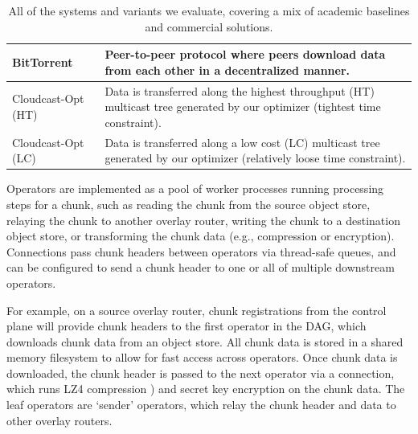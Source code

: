 \begin{table}[t!]
\begin{tabularx}{\textwidth}{ l X }
    BitTorrent~\cite{twitter-bittorrent} & Peer-to-peer protocol where peers download data from each other in a decentralized manner.\\
    \midrule
    Cloudcast-Opt (HT) & Data is transferred along the highest throughput (HT) multicast tree generated by our optimizer (tightest time constraint).\\
    Cloudcast-Opt (LC) & Data is transferred along a low cost (LC) multicast tree generated by our optimizer (relatively loose time constraint).\\
    \bottomrule
\end{tabularx}
\caption{All of the systems and variants we evaluate, covering a mix of academic baselines and commercial solutions.}
\label{tab:baselines}
\end{table}

Operators are implemented as a pool of worker processes running processing steps for a chunk, such as reading the chunk from the source object store, relaying the chunk to another overlay router, writing the chunk to a destination object store, or transforming the chunk data (e.g., compression or encryption).  Connections pass chunk headers between operators via thread-safe queues, and can be configured to send a chunk header to one or all of multiple downstream operators. 

For example, on a source overlay router, chunk registrations from the control plane will provide chunk headers to the first operator in the DAG, which downloads chunk data from an object store. All chunk data is stored in a shared memory filesystem to allow for fast access across operators. Once chunk data is downloaded, the chunk header is passed to the next operator via a connection, which runs LZ4 compression \cite{lz4}) and secret key encryption \cite{pynacl, libsodium} on the chunk data. The leaf operators are `sender' operators, which relay the chunk header and data to other overlay routers. 


